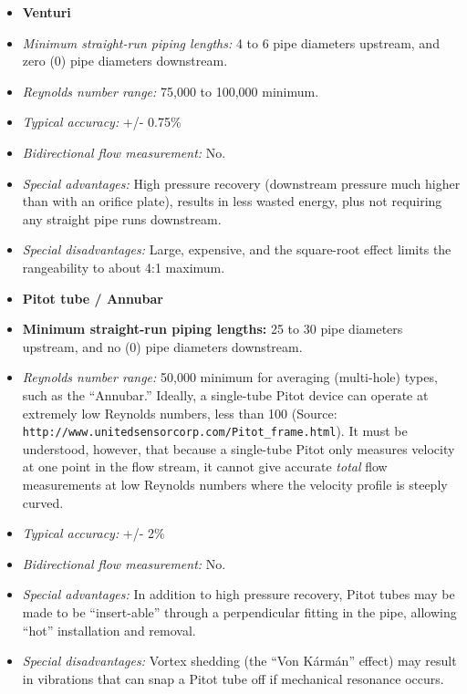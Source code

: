 \vskip 10pt


\begin{itemize}
\goodbreak
\item{} {\bf Venturi} 
\item{} {\it Minimum straight-run piping lengths:} 4 to 6 pipe diameters upstream, and zero (0) pipe diameters downstream.
\item{} {\it Reynolds number range:} 75,000 to 100,000 minimum.
\item{} {\it Typical accuracy:} +/- 0.75\%
\item{} {\it Bidirectional flow measurement:} No.
\item{} {\it Special advantages:} High pressure recovery (downstream pressure much higher than with an orifice plate), results in less wasted energy, plus not requiring any straight pipe runs downstream.
\item{} {\it Special disadvantages:} Large, expensive, and the square-root effect limits the rangeability to about 4:1 maximum.
\end{itemize}


\vskip 10pt


\begin{itemize}
\goodbreak
\item{} {\bf Pitot tube / Annubar} 
\item{} {\bf Minimum straight-run piping lengths:} 25 to 30 pipe diameters upstream, and no (0) pipe diameters downstream.
\item{} {\it Reynolds number range:} 50,000 minimum for averaging (multi-hole) types, such as the ``Annubar.''  Ideally, a single-tube Pitot device can operate at extremely low Reynolds numbers, less than 100 (Source: {\tt http://www.unitedsensorcorp.com/Pitot\_frame.html}).  It must be understood, however, that because a single-tube Pitot only measures velocity at one point in the flow stream, it cannot give accurate {\it total} flow measurements at low Reynolds numbers where the velocity profile is steeply curved.
\item{} {\it Typical accuracy:} +/- 2\%
\item{} {\it Bidirectional flow measurement:} No.
\item{} {\it Special advantages:} In addition to high pressure recovery, Pitot tubes may be made to be ``insert-able'' through a perpendicular fitting in the pipe, allowing ``hot'' installation and removal.
\item{} {\it Special disadvantages:} Vortex shedding (the ``Von K\'arm\'an'' effect) may result in vibrations that can snap a Pitot tube off if mechanical resonance occurs.
\end{itemize}


